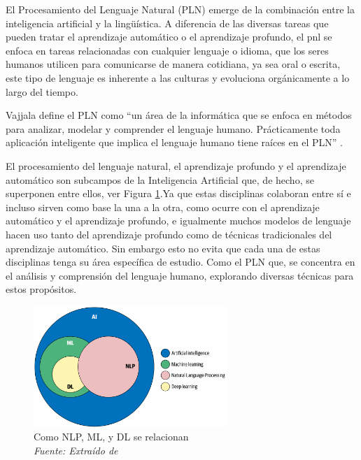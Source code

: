 El Procesamiento del Lenguaje Natural (PLN) emerge de la combinación entre la inteligencia artificial y la lingüística. A diferencia de las diversas tareas que pueden tratar el aprendizaje automático o el aprendizaje profundo, el pnl se enfoca en tareas relacionadas con cualquier lenguaje o idioma, que los seres humanos utilicen para comunicarse de manera cotidiana, ya sea oral o escrita, este tipo de lenguaje es inherente a las culturas y evoluciona orgánicamente a lo largo del tiempo.

Vajjala define el PLN como ``un área de la informática que se enfoca en métodos para analizar, modelar y comprender el lenguaje humano. Prácticamente toda aplicación inteligente que implica el lenguaje humano tiene raíces en el PLN'' \cite[p. 4]{vajjala2020practical}.
 
El procesamiento del lenguaje natural, el aprendizaje profundo y el aprendizaje automático son subcampos de la Inteligencia Artificial que, de hecho, se superponen  entre ellos, ver Figura \ref{fig:nlp1}.Ya que estas disciplinas colaboran entre sí e incluso sirven como base la una a la otra, como ocurre con el aprendizaje automático y el aprendizaje profundo, e igualmente  muchos modelos de lenguaje hacen uso tanto del aprendizaje profundo como de técnicas tradicionales del aprendizaje automático. Sin embargo esto no evita que cada una de estas disciplinas tenga su área específica de estudio. Como el PLN que, se concentra en el análisis y comprensión del lenguaje humano, explorando diversas técnicas para estos propósitos.

\begin{figure}[h!]
	\includegraphics[width=0.65\textwidth]{capitulo3/figuras/nlp1.png}
	\caption{Como NLP, ML, y DL se relacionan
		\\\textit{Fuente: Extraído de} \protect \cite[p. 15]{vajjala2020practical} } 
	\label{fig:nlp1}
\end{figure}
